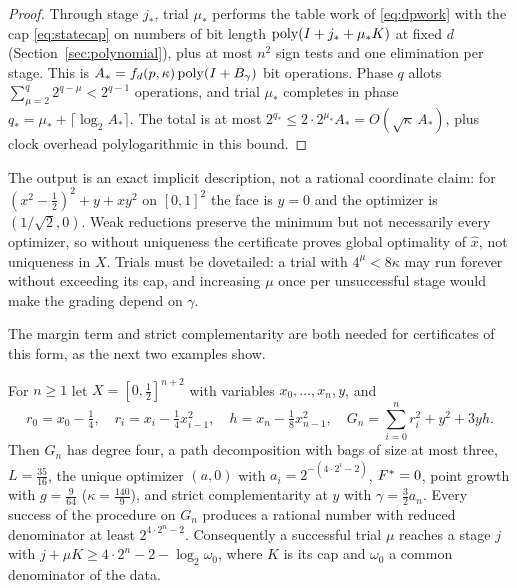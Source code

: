 \begin{proof}
Through stage $j_*$, trial $\mu_*$ performs the table work of
\eqref{eq:dpwork} with the cap \eqref{eq:statecap} on numbers of bit length
$\operatorname{poly}(I+j_*+\mu_*K)$ at fixed $d$ (Section~\ref{sec:polynomial}), plus at most
$n^2$ sign tests and one elimination per stage. This is
$A_*=f_d(p,\kappa)\operatorname{poly}(I+B_\gamma)$ bit operations. Phase $q$ allots
$\sum_{\mu=2}^q2^{q-\mu}<2^{q-1}$ operations, and trial $\mu_*$ completes in
phase $q_*=\mu_*+\lceil\log_2A_*\rceil$. The total is at most
$2^{q_*}\le2\cdot2^{\mu_*}A_*=O(\sqrt\kappa\,A_*)$, plus clock overhead
polylogarithmic in this bound.
\end{proof}

The output is an exact implicit description, not a rational coordinate claim:
for $(x^2-\frac12)^2+y+xy^2$ on $[0,1]^2$ the face is $y=0$ and the optimizer
is $(1/\sqrt2,0)$. Weak reductions preserve the minimum but not necessarily
every optimizer, so without uniqueness the certificate proves global
optimality of $\hat x$, not uniqueness in $X$. Trials must be dovetailed: a
trial with $4^\mu<8\kappa$ may run forever without exceeding its cap, and
increasing $\mu$ once per unsuccessful stage would make the grading depend on
$\gamma$.

The margin term and strict complementarity are both needed for certificates
of this form, as the next two examples show.

\begin{proposition}\label{prop:margin}
For $n\ge1$ let $X=[0,\frac12]^{n+2}$ with variables $x_0,\ldots,x_n,y$, and
\[
r_0=x_0-\tfrac14,\quad r_i=x_i-\tfrac14x_{i-1}^2,\quad
h=x_n-\tfrac18x_{n-1}^2,\quad
G_n=\sum_{i=0}^nr_i^2+y^2+3yh.
\]
Then $G_n$ has degree four, a path decomposition with bags of size at most
three, $L=\frac{35}{16}$, the unique optimizer $(a,0)$ with
$a_i=2^{-(4\cdot2^i-2)}$, $F^*=0$, point growth with $g=\frac9{64}$
($\kappa=\frac{140}9$), and strict complementarity at $y$ with
$\gamma=\frac32a_n$. Every success of the procedure on $G_n$ produces a
rational number with reduced denominator at least $2^{4\cdot2^n-2}$.
Consequently a successful trial $\mu$ reaches a stage $j$ with
$j+\mu K\ge4\cdot2^n-2-\log_2\omega_0$, where $K$ is its cap and $\omega_0$ a
common denominator of the data.
\end{proposition}

